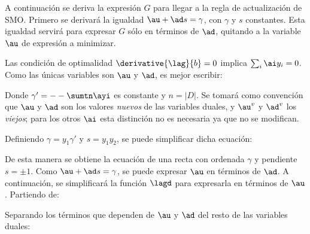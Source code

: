 A continuación se deriva la expresión $G$ para llegar a la regla de actualización de SMO. Primero se derivará la igualdad $\au  + \ad s = \gamma$, con $\gamma$ y $s$ constantes. Esta igualdad servirá para expresar $G$ sólo en términos de $\ad$, quitando a la variable $\au$ de expresión a minimizar.

Las condición de optimalidad $\derivative{\lag}{b}=0$ implica $\sum_i \ai y_i=0$. Como las únicas variables son $\au$ y $\ad$, es mejor escribir:


Donde $\gamma'=- -\sumtn \ayi $ es constante y $n=|D|$. Se tomará como convención que $\au$ y $\ad$ son los valores \textit{nuevos} de las variables duales, y $\au^v$ y $\ad^v$ los \textit{viejos}; para los otros $\ai$ esta distinción no es necesaria ya que no se modifican.

Definiendo $\gamma=y_1  \gamma'$ y $s=y_1 y_2$, se puede simplificar dicha ecuación:


De esta manera se obtiene la ecuación de una recta con ordenada $\gamma$ y pendiente $s=\pm 1$.  Como $\au  + \ad s = \gamma$, se puede expresar $\au$ en términos de $\ad$. A continuación, se simplificará la función $\lagd$ para expresarla en términos de $\au$. Partiendo de:


Separando los términos que dependen de $\au$ y $\ad$ del resto de las variables duales:


